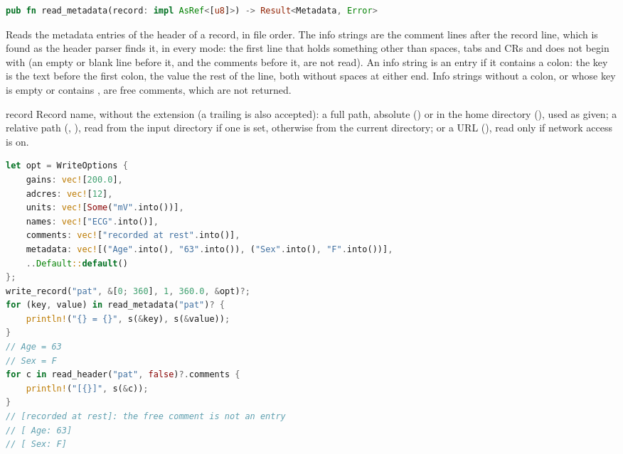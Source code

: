 \begin{lstlisting}[language=Rust,style=signature]
pub fn read_metadata(record: impl AsRef<[u8]>) -> Result<Metadata, Error>
\end{lstlisting}
Reads the metadata entries of the header of a record, in file order. The info strings are
the comment lines after the record line, which is found as the header parser finds it, in
every mode: the first line that holds something other than spaces, tabs and CRs and does
not begin with \code{\#} (an empty or blank line before it, and the comments before it,
are not read). An info string is an entry if it contains a colon: the key is the text
before the first colon, the value the rest of the line, both without spaces at either
end. Info strings without a colon, or
whose key is empty or contains \code{\#}, are free comments, which are not returned.
\begin{params}
\item[record] Record name, without the  extension (a trailing  is
  also accepted): a full path, absolute () or in the home
  directory (), used as given; a relative path
  (, ), read from the input directory if one is set,
  otherwise from the current directory; or a URL
  (), read only if network access is
  on.
\end{params}
\begin{lstlisting}[language=Rust,style=example]
let opt = WriteOptions {
    gains: vec![200.0],
    adcres: vec![12],
    units: vec![Some("mV".into())],
    names: vec!["ECG".into()],
    comments: vec!["recorded at rest".into()],
    metadata: vec![("Age".into(), "63".into()), ("Sex".into(), "F".into())],
    ..Default::default()
};
write_record("pat", &[0; 360], 1, 360.0, &opt)?;
for (key, value) in read_metadata("pat")? {
    println!("{} = {}", s(&key), s(&value));
}
// Age = 63
// Sex = F
for c in read_header("pat", false)?.comments {
    println!("[{}]", s(&c));
}
// [recorded at rest]: the free comment is not an entry
// [ Age: 63]
// [ Sex: F]
\end{lstlisting}

